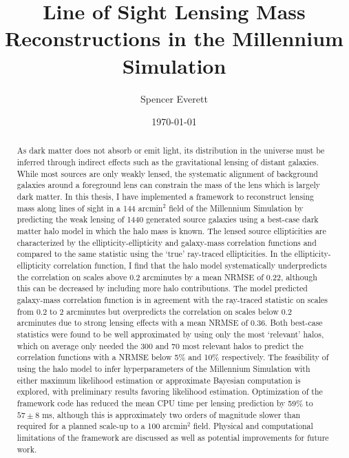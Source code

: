 \documentclass[%
 reprint,
 amsmath,amssymb,
 aps,nofootinbib
]{revtex4-1}
\begin{document}
\title{Line of Sight Lensing Mass Reconstructions in the Millennium Simulation}

\author{Spencer Everett}


\date{\today}

\begin{abstract}
\noindent As dark matter does not absorb or emit light, its distribution in the universe must be inferred through indirect effects such as the gravitational lensing of distant galaxies. While most sources are only weakly lensed, the systematic alignment of background galaxies around a foreground lens can constrain the mass of the lens which is largely dark matter. In this thesis, I have implemented a framework to reconstruct lensing mass along lines of sight in a 144 arcmin$^2$ field of the Millennium Simulation by predicting the weak lensing of 1440 generated source galaxies using a best-case dark matter halo model in which the halo mass is known. The lensed source ellipticities are characterized by the ellipticity-ellipticity and galaxy-mass correlation functions and compared to the same statistic using the `true' ray-traced ellipticities. In the ellipticity-ellipticity correlation function, I find that the halo model systematically underpredicts the correlation on scales above 0.2 arcminutes by a mean NRMSE of 0.22, although this can be decreased by including more halo contributions. The model predicted galaxy-mass correlation function is in agreement with the ray-traced statistic on scales from 0.2 to 2 arcminutes but overpredicts the correlation on scales below 0.2 arcminutes due to strong lensing effects with a mean NRMSE of 0.36. Both best-case statistics were found to be well approximated by using only the most `relevant' halos, which on average only needed the 300 and 70 most relevant halos to predict the correlation functions with a NRMSE below 5\% and 10\% respectively. The feasibility of using the halo model to infer hyperparameters of the Millennium Simulation with either maximum likelihood estimation or approximate Bayesian computation is explored, with preliminary results favoring likelihood estimation. Optimization of the framework code has reduced the mean CPU time per lensing prediction by 59\% to $57\pm8$ ms, although this is approximately two orders of magnitude slower than required for a planned scale-up to a 100 arcmin$^2$ field. Physical and computational limitations of the framework are discussed as well as potential improvements for future work.
\end{abstract}
\end{document}
